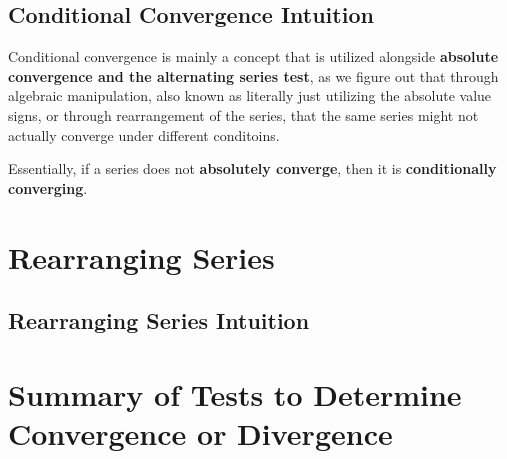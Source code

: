 \documentclass{report}
\begin{document}
\begin{sloppypar}
\subsection{Conditional Convergence Intuition}
Conditional convergence is mainly a concept that is
utilized alongside \textbf{absolute convergence and
  the alternating series test}, as we figure out
that through algebraic manipulation, also known as
literally just utilizing the absolute value signs, or
through rearrangement of the series, that the same
series might not actually converge under different
conditoins.
\par Essentially, if a series does not
\textbf{absolutely converge},
then it is \textbf{conditionally converging}.

\section{Rearranging Series}
\begin{center}
\end{center}

\subsection{Rearranging Series Intuition}

\section{Summary of Tests to Determine Convergence or
  Divergence}
\begin{center}
\end{center}
\end{sloppypar}
\end{document}
